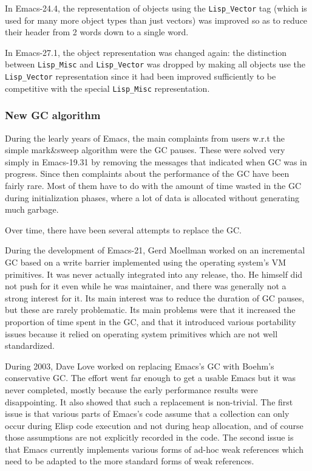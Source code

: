 \documentclass[format=acmsmall, review=false, screen=true]{acmart}
\newcommand \Elisp {Elisp}
\begin{document}
In Emacs-24.4, the representation of objects using the \texttt{Lisp\_Vector}
tag (which is used for many more object types than just vectors) was
improved so as to reduce their header from 2 words down to a single word.

In Emacs-27.1, the object representation was changed again: the distinction
between \texttt{Lisp\_Misc} and \texttt{Lisp\_Vector} was dropped by making
all objects use the \texttt{Lisp\_Vector} representation since it had been
improved sufficiently to be competitive with the special
\texttt{Lisp\_Misc} representation.


\subsubsection{New GC algorithm}
During the learly years of Emacs, the main complaints from users w.r.t the
simple mark\&sweep algorithm were the GC pauses.  These were solved very
simply in Emacs-19.31 by removing the messages that indicated when GC was in
progress.  Since then complaints about the performance of the GC have been
fairly rare.  Most of them have to do with the amount of time wasted in the
GC during initialization phases, where a lot of data is allocated without
generating much garbage.

Over time, there have been several attempts to replace the GC.

During the development of Emacs-21, Gerd Moellman worked on an incremental
GC based on a write barrier implemented using the operating system's VM
primitives.  It was never actually integrated into any release, tho.
He himself did not push for it even while he was maintainer, and there was
generally not a strong interest for it.  Its main interest was to reduce the
duration of GC pauses, but these are rarely problematic.  Its main problems
were that it increased the proportion of time spent in the GC, and that it
introduced various portability issues because it relied on operating system
primitives which are not well standardized.

During 2003, Dave Love worked on replacing Emacs's GC with Boehm's
conservative GC.  The effort went far enough to get a usable Emacs but it
was never completed, mostly because the early performance results were
disappointing.  It also showed that such a replacement is non-trivial.
The first issue is that various parts of Emacs's code assume that
a collection can only occur during \Elisp{} code execution and not during
heap allocation, and of course those assumptions are not explicitly recorded
in the code.  The second issue is that Emacs currently implements various
forms of ad-hoc weak references which need to be adapted to the more
standard forms of weak references.
\end{document}
